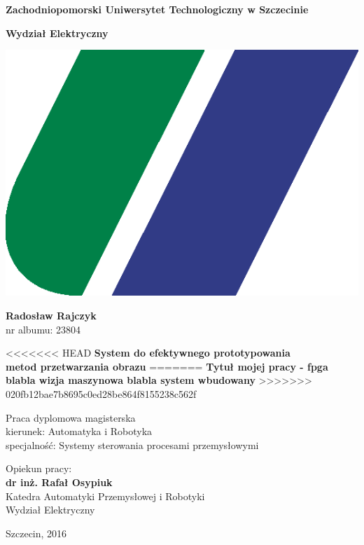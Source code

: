 \documentclass[document.tex]{subfiles}
\begin{document}
\begin{center}
\huge{\textbf{Zachodniopomorski Uniwersytet Technologiczny w Szczecinie}}

\LARGE{\textbf{Wydział Elektryczny}}

\vspace{0.5cm}
\includegraphics[scale=0.2]{imgs/logoNew.png}

\vspace{1cm}
\Large{\textbf{Radosław Rajczyk}} \\
\large{nr albumu: 23804}

\vspace{1cm}
<<<<<<< HEAD
\Large{\textbf{System do efektywnego prototypowania \\
metod przetwarzania obrazu}}
=======
\Large{\textbf{Tytuł mojej pracy - fpga blabla wizja maszynowa blabla system wbudowany}}
>>>>>>> 020fb12bae7b8695c0ed28be864f8155238c562f

\vspace{1cm}
\large{Praca dyplomowa magisterska \\
kierunek: Automatyka i Robotyka \\
specjalność: Systemy sterowania procesami przemysłowymi}
\end{center}

\vspace{4cm}
\begin{flushright}
\large{Opiekun pracy:\\
\textbf{dr inż. Rafał Osypiuk} \\
Katedra Automatyki Przemysłowej i Robotyki\\
Wydział Elektryczny}
\end{flushright}

\vspace{2cm}
\begin{center}
\Large{Szczecin, 2016}
\end{center}
\end{document}
